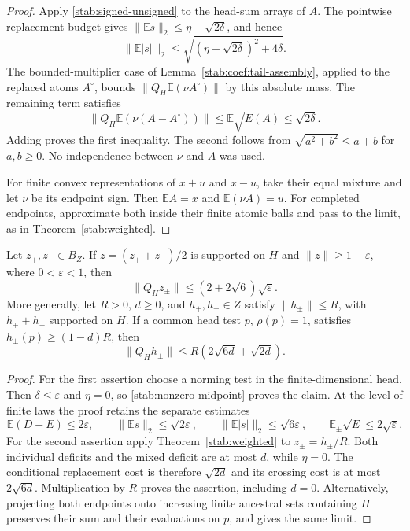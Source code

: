 \begin{proof}
Apply \eqref{stab:signed-unsigned} to the head-sum arrays of $A$.
The pointwise replacement budget gives
$\|\mathbb Es\|_2\le\eta+\sqrt{2\delta}$, and hence
\[
 \|\mathbb E|s|\|_2
 \le\sqrt{(\eta+\sqrt{2\delta})^2+4\delta}.
\]
The bounded-multiplier case of
Lemma~\ref{stab:coef:tail-assembly}, applied to the replaced atoms
$A^\circ$, bounds $\|Q_H\mathbb E(\nu A^\circ)\|$ by this
absolute mass.  The remaining term satisfies
\[
 \|Q_H\mathbb E(\nu(A-A^\circ))\|
 \le\mathbb E\sqrt{E(A)}\le\sqrt{2\delta}.
\]
Adding proves the first inequality.  The second follows from
$\sqrt{a^2+b^2}\le a+b$ for $a,b\ge0$.  No independence between
$\nu$ and $A$ was used.

For finite convex representations of $x+u$ and $x-u$, take their
equal mixture and let $\nu$ be its endpoint sign.  Then
$\mathbb EA=x$ and $\mathbb E(\nu A)=u$.  For completed endpoints,
approximate both inside their finite atomic balls and pass to the
limit, as in Theorem~\ref{stab:weighted}.
\end{proof}

\begin{corollary}\label{stab:supported-pair}
Let $z_+,z_-\in B_Z$.  If $z=(z_++z_-)/2$ is supported on $H$
and $\|z\|\ge1-\varepsilon$, where $0<\varepsilon<1$, then
\begin{equation}\label{stab:supported-bound}
 \|Q_Hz_\pm\|\le(2+2\sqrt6)\sqrt\varepsilon.
\end{equation}
More generally, let $R>0$, $d\ge0$, and $h_+,h_-\in Z$ satisfy
$\|h_\pm\|\le R$, with $h_++h_-$ supported on $H$.
If a common head test $p$, $\rho(p)=1$, satisfies
$h_\pm(p)\ge(1-d)R$, then
\begin{equation}\label{stab:common-test-bound}
 \|Q_Hh_\pm\|\le R(2\sqrt{6d}+\sqrt{2d}).
\end{equation}
\end{corollary}

\begin{proof}
For the first assertion choose a norming test in the finite-dimensional
head.  Then $\delta\le\varepsilon$ and $\eta=0$, so
\eqref{stab:nonzero-midpoint} proves the claim.  At the level of
finite laws the proof retains the separate estimates
\[
 \mathbb E(D+E)\le2\varepsilon,\qquad
 \|\mathbb E s\|_2\le\sqrt{2\varepsilon},\qquad
 \|\mathbb E|s|\|_2\le\sqrt{6\varepsilon},\qquad
 \mathbb E_\pm\sqrt E\le2\sqrt\varepsilon.
\]
For the second assertion apply Theorem~\ref{stab:weighted} to
$z_\pm=h_\pm/R$.  Both individual deficits and the mixed deficit
are at most $d$, while $\eta=0$.  The conditional replacement
cost is therefore $\sqrt{2d}$ and its crossing cost is at most
$2\sqrt{6d}$.  Multiplication by $R$ proves the assertion, including
$d=0$.  Alternatively, projecting both endpoints onto increasing
finite ancestral sets containing $H$ preserves their sum and their
evaluations on $p$, and gives the same limit.
\end{proof}

